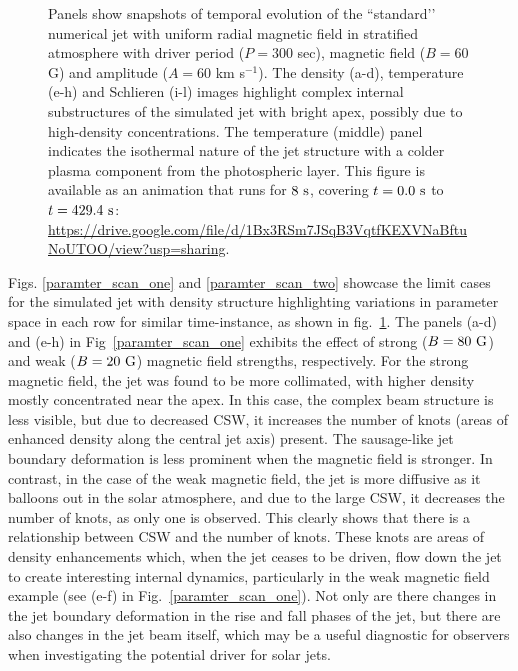 \begin{figure}
\captionsetup[subfigure]{labelformat=empty}
\centering
{}
\caption{Panels show snapshots of temporal evolution of the ``standard’’ numerical jet with uniform radial magnetic field in stratified atmosphere with driver period ($P = 300$ sec), magnetic field ($B = 60$ G) and amplitude ($A = 60$ km s$^{-1}$). The density (a-d), temperature (e-h) and Schlieren (i-l) images highlight complex internal substructures of the simulated jet with bright apex, possibly due to high-density concentrations. The temperature (middle) panel indicates the isothermal nature of the jet structure with a colder plasma component from the photospheric layer. This figure is available as an animation that runs for $8~\rm{s}$, covering $t=0.0~\rm{s}$ to $t=429.4~\rm{s}$: \url{https://drive.google.com/file/d/1Bx3RSm7JSqB3VqtfKEXVNaBftuNoUTOO/view?usp=sharing}.}
\label{standard_jet}
\end{figure}
Figs. \ref{paramter_scan_one} and \ref{paramter_scan_two} showcase the limit cases for the simulated jet with density structure highlighting variations in parameter space in each row for similar time-instance, as shown in fig.~\ref{standard_jet}. The panels (a-d) and (e-h) in Fig~\ref{paramter_scan_one} exhibits the effect of strong ($B = 80~\rm{G}$) and weak ($B = 20~\rm{G}$) magnetic field strengths, respectively. For the strong magnetic field, the jet was found to be more collimated, with higher density mostly concentrated near the apex. In this case, the complex beam structure is less visible, but due to decreased CSW, it increases the number of knots (areas of enhanced density along the central jet axis) present. The sausage-like jet boundary deformation is less prominent when the magnetic field is stronger. In contrast, in the case of the weak magnetic field, the jet is more diffusive as it balloons out in the solar atmosphere, and due to the large CSW, it decreases the number of knots, as only one is observed. This clearly shows that there is a relationship between CSW and the number of knots. These knots are areas of density enhancements which, when the jet ceases to be driven, flow down the jet to create interesting internal dynamics, particularly in the weak magnetic field example (see (e-f) in Fig.~\ref{paramter_scan_one}). Not only are there changes in the jet boundary deformation in the rise and fall phases of the jet, but there are also changes in the jet beam itself, which may be a useful diagnostic for observers when investigating the potential driver for solar jets. \np    
